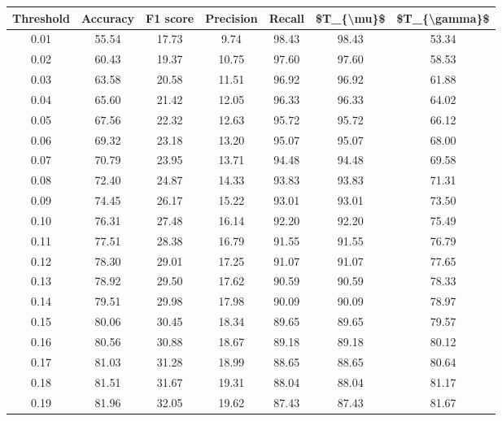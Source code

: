 \begin{tabular}{|c|c|c|c|c|c|c|}
\hline
 Threshold &  Accuracy &  F1 score &  Precision &  Recall &  \$T\_\{\textbackslash mu\}\$ &  \$T\_\{\textbackslash gamma\}\$ \\
\hline
      0.01 &     55.54 &     17.73 &       9.74 &   98.43 &      98.43 &         53.34 \\
      0.02 &     60.43 &     19.37 &      10.75 &   97.60 &      97.60 &         58.53 \\
      0.03 &     63.58 &     20.58 &      11.51 &   96.92 &      96.92 &         61.88 \\
      0.04 &     65.60 &     21.42 &      12.05 &   96.33 &      96.33 &         64.02 \\
      0.05 &     67.56 &     22.32 &      12.63 &   95.72 &      95.72 &         66.12 \\
      0.06 &     69.32 &     23.18 &      13.20 &   95.07 &      95.07 &         68.00 \\
      0.07 &     70.79 &     23.95 &      13.71 &   94.48 &      94.48 &         69.58 \\
      0.08 &     72.40 &     24.87 &      14.33 &   93.83 &      93.83 &         71.31 \\
      0.09 &     74.45 &     26.17 &      15.22 &   93.01 &      93.01 &         73.50 \\
      0.10 &     76.31 &     27.48 &      16.14 &   92.20 &      92.20 &         75.49 \\
      0.11 &     77.51 &     28.38 &      16.79 &   91.55 &      91.55 &         76.79 \\
      0.12 &     78.30 &     29.01 &      17.25 &   91.07 &      91.07 &         77.65 \\
      0.13 &     78.92 &     29.50 &      17.62 &   90.59 &      90.59 &         78.33 \\
      0.14 &     79.51 &     29.98 &      17.98 &   90.09 &      90.09 &         78.97 \\
      0.15 &     80.06 &     30.45 &      18.34 &   89.65 &      89.65 &         79.57 \\
      0.16 &     80.56 &     30.88 &      18.67 &   89.18 &      89.18 &         80.12 \\
      0.17 &     81.03 &     31.28 &      18.99 &   88.65 &      88.65 &         80.64 \\
      0.18 &     81.51 &     31.67 &      19.31 &   88.04 &      88.04 &         81.17 \\
      0.19 &     81.96 &     32.05 &      19.62 &   87.43 &      87.43 &         81.67 \\

\end{tabular}
